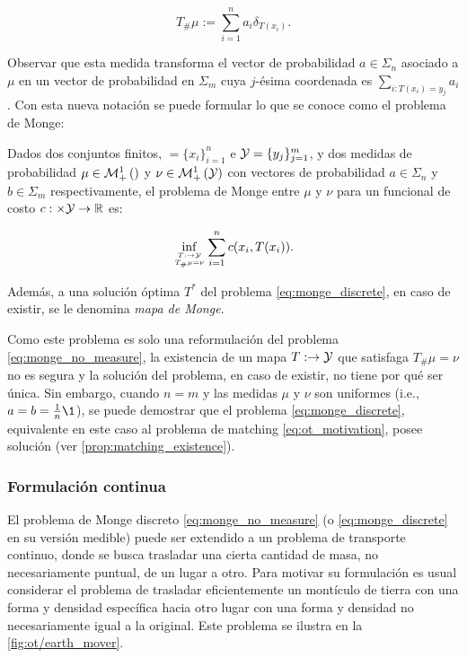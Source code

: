 \begin{equation}
	\label{eq:push_forward_discrete}
	T_\#\mu := \sum_{i=1}^n a_i \delta_{T(x_i)}.
\end{equation}

Observar que esta medida transforma el vector de probabilidad $a\in\Sigma_n$ asociado a $\mu$ en un vector de probabilidad en $\Sigma_m$ cuya $j$-ésima coordenada es $\sum_{i:T(x_i)=y_j} a_i$. Con esta nueva notación se puede formular lo que se conoce como el problema de Monge:

\begin{defn}
	Dados dos conjuntos finitos, $\xspace=\{x_i\}_{i=1}^n$ e $\mathcal{Y}=\{y_j\}_{j=1}^m$, y dos medidas de probabilidad $\mu\in\mathcal{M}_+^1\left(\right)$ y $\nu\in\mathcal{M}_+^1\left(\mathcal{Y}\right)$ con vectores de probabilidad $a\in\Sigma_n$ y $b\in\Sigma_m$ respectivamente, el problema de Monge entre $\mu$ y $\nu$ para un funcional de costo $c:\times\mathcal{Y}\to\mathbb{R}$ es:

	\begin{equation}
		\label{eq:monge_discrete}
		\inf_{\feasible{T:\xspace\to\yspace}{T_\#\mu=\nu}}
		\sum_{i=1}^n c(x_i,T(x_i)).
	\end{equation}

	Además, a una solución óptima $T^*$ del problema \eqref{eq:monge_discrete}, en caso de existir, se le denomina \textit{mapa de Monge}.
\end{defn}

Como este problema es solo una reformulación del problema \eqref{eq:monge_no_measure}, la existencia de un mapa $T:\to\mathcal{Y}$ que satisfaga $T_\#\mu = \nu$ no es segura y la solución del problema, en caso de existir, no tiene por qué ser única. Sin embargo, cuando $n=m$ y las medidas $\mu$ y $\nu$ son uniformes (i.e., $a=b=\frac{1}{n}\1$), se puede demostrar que el problema \eqref{eq:monge_discrete}, equivalente en este caso al problema de matching \eqref{eq:ot_motivation}, posee solución (ver \autoref{prop:matching_existence}).

\subsubsection{Formulación continua}

El problema de Monge discreto \eqref{eq:monge_no_measure} (o \eqref{eq:monge_discrete} en su versión medible) puede ser extendido a un problema de transporte continuo, donde se busca trasladar una cierta cantidad de masa, no necesariamente puntual, de un lugar a otro. Para motivar su formulación es usual considerar el problema de trasladar eficientemente un montículo de tierra con una forma y densidad específica hacia otro lugar con una forma y densidad no necesariamente igual a la original. Este problema se ilustra en la \autoref{fig:ot/earth_mover}.

